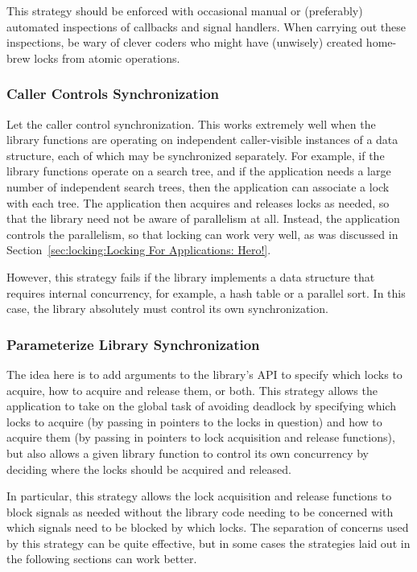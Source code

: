 This strategy should be enforced with occasional manual or (preferably)
automated inspections of callbacks and signal handlers.
When carrying out these inspections, be wary of clever coders who
might have (unwisely) created home-brew locks from atomic operations.

\subsubsection{Caller Controls Synchronization}
\label{sec:locking:Caller Controls Synchronization}

Let the caller control synchronization.
This works extremely well when the library functions are operating
on independent caller-visible instances of a data structure, each
of which may be synchronized separately.
For example, if the library functions operate on a search tree,
and if the application needs a large number of independent search
trees, then the application can associate a lock with each tree.
The application then acquires and releases locks as needed, so
that the library need not be aware of parallelism at all.
Instead, the application controls the parallelism, so that locking
can work very well, as was discussed in
Section~\ref{sec:locking:Locking For Applications: Hero!}.

However, this strategy fails if the
library implements a data structure that requires internal
concurrency, for example, a hash table or a parallel sort.
In this case, the library absolutely must control its own
synchronization.

\subsubsection{Parameterize Library Synchronization}
\label{sec:locking:Parameterize Library Synchronization}

The idea here is to add arguments to the library's API to specify
which locks to acquire, how to acquire and release them, or both.
This strategy allows the application to take on the global task of
avoiding deadlock by specifying which locks to acquire (by passing in
pointers to the locks in question) and how to
acquire them (by passing in pointers to lock acquisition and release
functions),
but also allows a given library function to control its own concurrency
by deciding where the locks should be acquired and released.

In particular, this strategy allows the lock acquisition and release
functions to block signals as needed without the library code needing to
be concerned with which signals need to be blocked by which locks.
The separation of concerns used by this strategy can be quite effective,
but in some cases the strategies laid out in the following sections
can work better.


